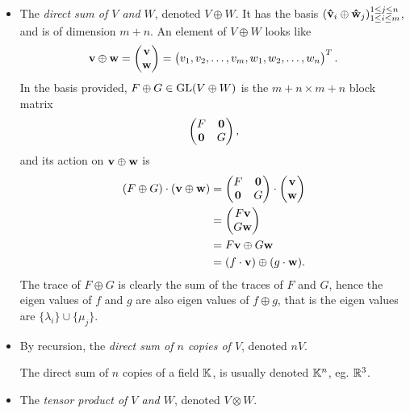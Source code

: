 		\begin{itemize}
			\item The \emph{direct sum of $V$ and $W$}, denoted $V \oplus W$.
				\subitem It has the basis $(\mathbf{\hat{v}}_i \oplus \mathbf{\hat{w}}_j)_{1 \leq i \leq m}^{1 \leq j \leq n}$, and is of dimension $m+n$.
				\subitem An element of $V \oplus W$ looks like \begin{align*}
					\mathbf{v} \oplus \mathbf{w} = \begin{pmatrix}
						\mathbf{v} \\ \mathbf{w}
					\end{pmatrix} = \begin{pmatrix}
					v_1, v_2, \dots, v_m, w_1, w_2, \dots, w_n
					\end{pmatrix}^T.
				\end{align*}
				\subitem In the basis provided, $F \oplus G \in \text{GL}(V \oplus W)$ is the $m+n \times m+n$ block matrix 
				\begin{align*}
					\begin{pmatrix}
						F & \mathbf{0} \\ 
						\mathbf{0} & G
					\end{pmatrix},
				\end{align*}
				and its action on $\mathbf{v} \oplus \mathbf{w}$ is 
				\begin{align*}
					(F \oplus G ) \cdot (\mathbf{v}  \oplus \mathbf{w}) &= \begin{pmatrix}
						F & \mathbf{0} \\ 
						\mathbf{0} & G
					\end{pmatrix} \cdot \begin{pmatrix}
					\mathbf{v} \\ \mathbf{w}
					\end{pmatrix} \\ 
					&= \begin{pmatrix}
					F\mathbf{v} \\ G\mathbf{w}
					\end{pmatrix}  \\ 
					&= F\mathbf{v} \oplus G\mathbf{w} \\
					&= (f \cdot \mathbf{v}) \oplus (g \cdot \mathbf{w}).
				\end{align*}
				\subitem The trace of $F \oplus G$ is clearly the sum of the traces of $F$ and $G$, hence the eigen values of $f$ and $g$ are also eigen values of $f \oplus g$, that is the eigen values are $\{\lambda_i\} \cup \{\mu_j\}$.
			\item By recursion, the \emph{direct sum of $n$ copies of $V$}, denoted $nV$.
				\subitem \begin{example}
					The direct sum of $n$ copies of a field $\mathbb{K}$, is usually denoted $\mathbb{K}^n$, eg. $\mathbb{R}^3$.
				\end{example}
				
			\item The \emph{tensor product of $V$ and $W$}, denoted $V \otimes W$.
		\end{itemize}
		
